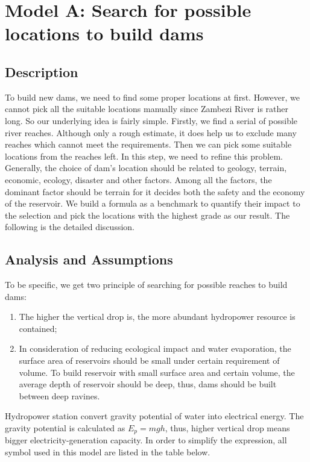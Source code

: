 \documentclass{mcmthesis}
\begin{document}

\section{Model A: Search for possible locations to build dams}
\subsection{Description}
\indent \indent To build new dams, we need to find some proper locations at first. However, we cannot pick all the suitable locations manually since Zambezi River is rather long. So our underlying idea is fairly simple. Firstly, we find a serial of possible river reaches. Although only a rough estimate, it does help us to exclude many reaches which cannot meet the requirements. Then we can pick some suitable locations from the reaches left. In this step, we need to refine this problem. Generally, the choice of dam's location should be related to geology, terrain, economic, ecology, disaster and other factors. Among all the factors, the dominant factor should be terrain for it decides both the safety and the economy of the reservoir. We build a formula as a benchmark to quantify their impact to the selection and pick the locations with the highest grade as our result. The following is the detailed discussion. \\

\subsection{Analysis and Assumptions}
\indent \indent To be specific, we get two principle of searching for possible reaches to build dams:
\begin{enumerate}
  \setlength{\itemsep}{0pt}
  \setlength{\parsep}{0pt}
  \setlength{\parskip}{0pt}
  \item The higher the vertical drop is, the more abundant hydropower resource is contained;
  \item In consideration of reducing ecological impact and water evaporation, the surface area of reservoirs should be small under certain requirement of volume. To build reservoir with small surface area and certain volume, the average depth of reservoir should be deep, thus, dams should be built between deep ravines.
\end{enumerate}

\indent Hydropower station convert gravity potential of water into electrical energy. The gravity potential is calculated as $E_{p} = mgh$, thus, higher vertical drop means bigger electricity-generation capacity. In order to simplify the expression, all symbol used in this model are listed in the table below.\\
\end{document}
